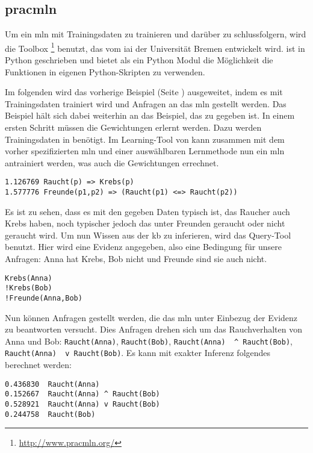 \subsection{pracmln}
\label{subsec:pracmln}
Um ein \gls{mln} mit Trainingsdaten zu trainieren und darüber zu schlussfolgern, wird die Toolbox \pracmln\footnote{\url{http://www.pracmln.org/}} benutzt, das vom \gls{iai} der Universität Bremen entwickelt wird. \pracmln ist in Python geschrieben und bietet als ein Python Modul die Möglichkeit die Funktionen in eigenen Python-Skripten zu verwenden. \par 
Im folgenden wird das vorherige Beispiel (Seite \pageref{mlnexample}) ausgeweitet, indem es mit Trainingsdaten trainiert wird und Anfragen an das \gls{mln} gestellt werden. Das Beispiel hält sich dabei weiterhin an das Beispiel, das zu \pracmln gegeben ist.  \newline
In einem ersten Schritt müssen die Gewichtungen erlernt werden. Dazu werden Trainingsdaten in benötigt. 
Im Learning-Tool von \pracmln kann zusammen mit dem vorher spezifizierten \gls{mln} und einer auswählbaren Lernmethode nun ein \gls{mln} antrainiert werden, was auch die Gewichtungen errechnet.     
\begin{lstlisting}[backgroundcolor=\color{backcolour}]
1.126769 Raucht(p) => Krebs(p)
1.577776 Freunde(p1,p2) => (Raucht(p1) <=> Raucht(p2))
\end{lstlisting}  
Es ist zu sehen, dass es mit den gegeben Daten typisch ist, das Raucher auch Krebs haben, noch typischer jedoch das unter Freunden geraucht oder nicht geraucht wird.\newline
Um nun Wissen aus der \gls{kb} zu inferieren, wird das Query-Tool benutzt. Hier wird eine Evidenz angegeben, also eine Bedingung für unsere Anfragen: Anna hat Krebs, Bob nicht und Freunde sind sie auch nicht. 
\begin{lstlisting}[backgroundcolor=\color{backcolour}]
Krebs(Anna)
!Krebs(Bob)
!Freunde(Anna,Bob)
\end{lstlisting} 
Nun können Anfragen gestellt werden, die das \gls{mln} unter Einbezug der Evidenz zu beantworten versucht. Dies Anfragen drehen sich um das Rauchverhalten von Anna und Bob: \lstinline[breaklines=true]{Raucht(Anna)}, \lstinline[breaklines=true]{Raucht(Bob)}, \lstinline[breaklines=true]{Raucht(Anna)  ^ Raucht(Bob)}, \lstinline[breaklines=true]{Raucht(Anna)  v Raucht(Bob)}. \newline
Es kann mit exakter Inferenz folgendes berechnet werden: 
\begin{lstlisting}[backgroundcolor=\color{backcolour}]
0.436830  Raucht(Anna)
0.152667  Raucht(Anna) ^ Raucht(Bob)
0.528921  Raucht(Anna) v Raucht(Bob)
0.244758  Raucht(Bob)
\end{lstlisting} 

